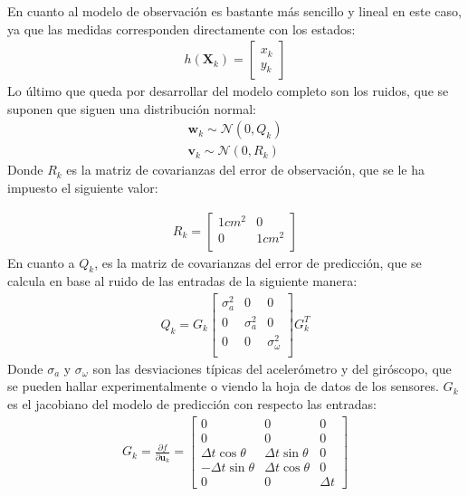 En cuanto al modelo de observación es bastante más sencillo y lineal en este caso, ya que las medidas corresponden directamente con los estados:
\begin{align}
h(\bm{X}_k) =  
\begin{bmatrix} 
x_k \\ y_k
\end{bmatrix}
\end{align}
Lo último que queda por desarrollar del modelo completo son los ruidos, que se suponen que siguen una distribución normal:
\begin{align}
\bm{w}_k \sim \mathcal{N}(0,Q_k) \\
\bm{v}_k \sim \mathcal{N}(0,R_k)
\end{align}
Donde $R_k$ es la matriz de covarianzas del error de observación, que se le ha impuesto el siguiente valor:

\begin{align}
R_k = 
\begin{bmatrix} 
1cm^2 & 0 \\ 0  & 1cm^2\\
\end{bmatrix} 
\end{align}
En cuanto a $Q_k$, es la matriz de covarianzas del error de predicción, que se calcula en base al ruido de las entradas de la siguiente manera:
\begin{align}
Q_k = 
G_k
\begin{bmatrix} 
\sigma^2_a 	& 0 		& 0\\
0 		& \sigma^2_a 	& 0\\
0 		& 0 		& \sigma^2_\omega\\
\end{bmatrix}
G_k^T
\end{align}
Donde $\sigma_a$ y $\sigma_\omega$ son las desviaciones típicas del acelerómetro y del giróscopo, que se pueden hallar experimentalmente o viendo la hoja de datos de los sensores. $G_k$ es el jacobiano del modelo de predicción con respecto las entradas: 
\begin{align}
G_k =  \frac{\partial f}{\partial \bm{u}_k}=
\begin{bmatrix} 
0 			&0			&0\\
0 			&0			&0\\
\Delta t \cos{\theta} 	&\Delta t \sin{\theta}	&0\\
-\Delta t \sin{\theta} 	&\Delta t \cos{\theta}	&0\\
0 			&0			&\Delta t		
\end{bmatrix}
\end{align}

